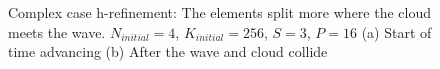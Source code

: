 \begin{figure}[H]
    \centering
    \hfill
    \caption{Complex case h-refinement: The elements split more where the cloud meets the wave.
        \(N_{initial} = 4\), \(K_{initial} = 256\), \(S = 3\), \(P = 16\) (a) Start of time
        advancing (b) After the wave and cloud collide}\label{fig:cloud_s}
\end{figure}

